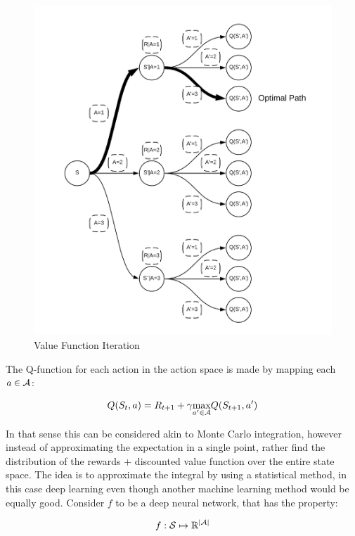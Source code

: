 \begin{figure}[ht]
    \centering
    \includegraphics[scale=0.15]{figures/vfi_figure.png}
    \caption{Value Function Iteration}
    \label{fig:vfi_figure}
\end{figure}

The Q-function for each action in the action space is made by mapping each $a\in \mathcal{A}$:

\begin{equation}
 Q(S_t, a) = R_{t+1} + \gamma \underset{a'\in \mathcal{A}}{\max} Q(S_{t+1}, a')
\end{equation}

In that sense this can be considered akin to Monte Carlo integration, however instead of approximating the expectation in a single point, rather find the distribution of the rewards + discounted value function over the entire state space. The idea is to approximate the integral by using a statistical method, in this case deep learning even though another machine learning method would be equally good. Consider $f$ to be a deep neural network, that has the property:

\begin{equation}
    f: \mathcal{S} \mapsto\mathbb{R}^{\mid \mathcal{A} \mid}
\end{equation}


